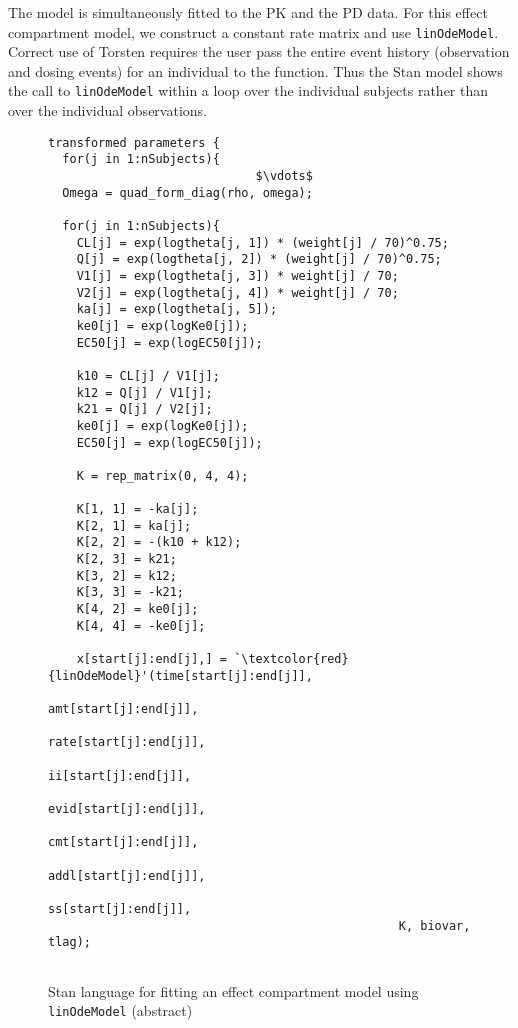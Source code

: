 \documentclass[11pt]{amsart}
\newenvironment{fmpage}[1]
     {\begin{lrbox}{\fmbox}\begin{minipage}{#1}}
     {\end{minipage}\end{lrbox}\fbox{\usebox{\fmbox}}}
\begin{document}
The model is simultaneously fitted to the PK and the PD data. For this effect compartment model, we construct a constant rate matrix and use \texttt{linOdeModel}. Correct use of Torsten requires the user pass the entire event history (observation and dosing events) for an individual to the function. Thus the Stan model shows the call to \texttt{linOdeModel} within a loop over the individual subjects rather than over the individual observations.

\begin{figure}
\caption{Stan language for fitting an effect compartment model using \texttt{linOdeModel} (abstract)}
\begin{small} 
\begin{center}
\begin{fmpage}{\textwidth - .75in}
\begin{lstlisting}[basicstyle=\tiny\ttfamily,mathescape=true,flexiblecolumns=true,frame=single,escapeinside=`']
transformed parameters {
  for(j in 1:nSubjects){
                             $\vdots$
  Omega = quad_form_diag(rho, omega);

  for(j in 1:nSubjects){
    CL[j] = exp(logtheta[j, 1]) * (weight[j] / 70)^0.75;
    Q[j] = exp(logtheta[j, 2]) * (weight[j] / 70)^0.75;
    V1[j] = exp(logtheta[j, 3]) * weight[j] / 70;
    V2[j] = exp(logtheta[j, 4]) * weight[j] / 70;
    ka[j] = exp(logtheta[j, 5]);
    ke0[j] = exp(logKe0[j]);
    EC50[j] = exp(logEC50[j]);

    k10 = CL[j] / V1[j];
    k12 = Q[j] / V1[j];
    k21 = Q[j] / V2[j];                       
    ke0[j] = exp(logKe0[j]);
    EC50[j] = exp(logEC50[j]);

    K = rep_matrix(0, 4, 4);
    
    K[1, 1] = -ka[j];
    K[2, 1] = ka[j];
    K[2, 2] = -(k10 + k12);
    K[2, 3] = k21;
    K[3, 2] = k12;
    K[3, 3] = -k21;
    K[4, 2] = ke0[j];
    K[4, 4] = -ke0[j];
           
    x[start[j]:end[j],] = `\textcolor{red}{linOdeModel}'(time[start[j]:end[j]], 
                                                 amt[start[j]:end[j]], 
                                                 rate[start[j]:end[j]],
                                                 ii[start[j]:end[j]], 
                                                 evid[start[j]:end[j]],
                                                 cmt[start[j]:end[j]], 
                                                 addl[start[j]:end[j]], 
                                                 ss[start[j]:end[j]], 
                                                 K, biovar, tlag);


\end{lstlisting}
\end{fmpage}
\end{center}
\end{small}
\end{figure}
\end{document}
